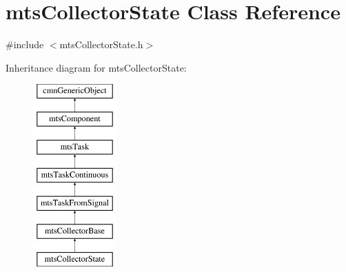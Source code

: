 \hypertarget{classmts_collector_state}{\section{mts\-Collector\-State Class Reference}
\label{classmts_collector_state}
}


{\ttfamily \#include $<$mts\-Collector\-State.\-h$>$}

Inheritance diagram for mts\-Collector\-State\-:\begin{figure}[H]
\begin{center}
\leavevmode
\includegraphics[height=7.000000cm]{dd/dde/classmts_collector_state}
\end{center}
\end{figure}
